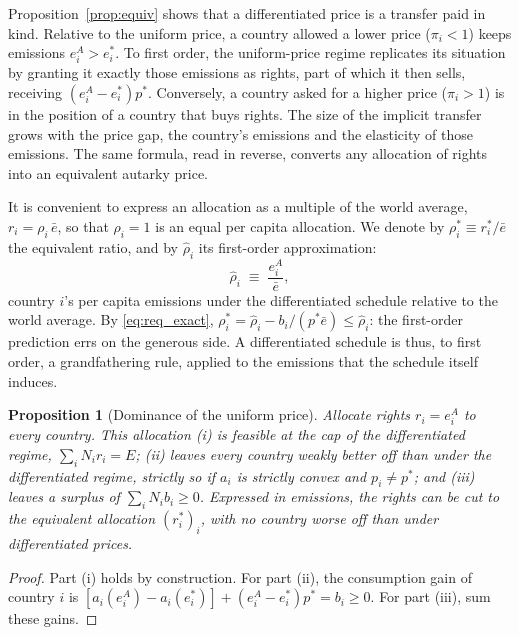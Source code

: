\documentclass[12pt,english]{article}
\newtheorem{proposition}{Proposition}
\theoremstyle{remark}
\begin{document}
Proposition~\ref{prop:equiv} shows that a differentiated price is a transfer paid in kind. Relative to the uniform price, a country allowed a lower price ($\pi_i<1$) keeps emissions $e^A_i>e^*_i$. To first order, the uniform-price regime replicates its situation by granting it exactly those emissions as rights, part of which it then sells, receiving $(e^A_i-e^*_i)p^*$. Conversely, a country asked for a higher price ($\pi_i>1$) is in the position of a country that buys rights. The size of the implicit transfer grows with the price gap, the country's emissions and the elasticity of those emissions. The same formula, read in reverse, converts any allocation of rights into an equivalent autarky price.

It is convenient to express an allocation as a multiple of the world average, $r_i=\rho_i\,\bar e$, so that $\rho_i=1$ is an equal per capita allocation. We denote by $\rho^*_i\equiv r^*_i/\bar e$ the equivalent ratio, and by $\hat\rho_i$ its first-order approximation:
\begin{equation}
  \hat\rho_i \;\equiv\; \frac{e^A_i}{\bar e},
  \label{eq:rhohat_static}
\end{equation}
country $i$'s per capita emissions under the differentiated schedule relative to the world average. By \eqref{eq:req_exact}, $\rho^*_i=\hat\rho_i-b_i/(p^*\bar e)\le\hat\rho_i$: the first-order prediction errs on the generous side. A differentiated schedule is thus, to first order, a grandfathering rule, applied to the emissions that the schedule itself induces.

\begin{proposition}[Dominance of the uniform price]\label{prop:dominance}
Allocate rights $r_i=e^A_i$ to every country. This allocation (i) is feasible at the cap of the differentiated regime, $\sum_i N_i r_i=E$; (ii) leaves every country weakly better off than under the differentiated regime, strictly so if $a_i$ is strictly convex and $p_i\neq p^*$; and (iii) leaves a surplus of $\sum_i N_i b_i\geq 0$. Expressed in emissions, the rights can be cut %
to the equivalent allocation $(r^*_i)_i$, with no country worse off than under differentiated prices.
\end{proposition}

\begin{proof}
Part (i) holds by construction. For part (ii), the consumption gain of country $i$ is $[a_i(e^A_i)-a_i(e^*_i)]+(e^A_i-e^*_i)p^*=b_i\geq0$. For part (iii), sum these gains. 
\end{proof}
\end{document}

